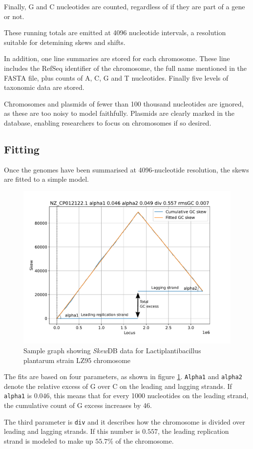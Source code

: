 \documentclass[fleqn,10pt]{wlscirep}
\begin{document}
Finally, G and C nucleotides are counted, regardless of if they are part of a gene or not.

These running totals are emitted at 4096 nucleotide intervals, a resolution suitable for detemining skews and shifts.

In addition, one line summaries are stored for each chromosome. These line includes the RefSeq identifier of the chromosome, the full name mentioned in the FASTA file, plus counts of A, C, G and T nucleotides. Finally five levels of taxonomic data are stored.

Chromosomes and plasmids of fewer than 100 thousand nucleotides are ignored, as these are too noisy to model faithfully. Plasmids are clearly marked in the database, enabling researchers to focus on chromosomes if so desired.

\subsection*{Fitting}
Once the genomes have been summarised at 4096-nucleotide resolution, the skews are fitted to a simple model.

\begin{figure}[ht]
\centering
\includegraphics[width=0.5\linewidth]{explainer.pdf}
\caption{Sample graph showing \emph{Skew}DB data for Lactiplantibacillus plantarum strain LZ95 chromosome}
\label{fig:explainer-graph}
\end{figure}

The fits are based on four parameters, as shown in figure \ref{fig:explainer-graph}. {\tt Alpha1} and {\tt alpha2} denote the relative excess of G over C on the leading and lagging strands. If {\tt alpha1} is $0.046$, this means that for every 1000 nucleotides on the leading strand, the cumulative count of G excess increases by 46.

The third parameter is {\tt div} and it describes how the chromosome is divided over leading and lagging strands. If this number is $0.557$, the leading replication strand is modeled to make up $55.7\%$ of the chromosome.
\end{document}
